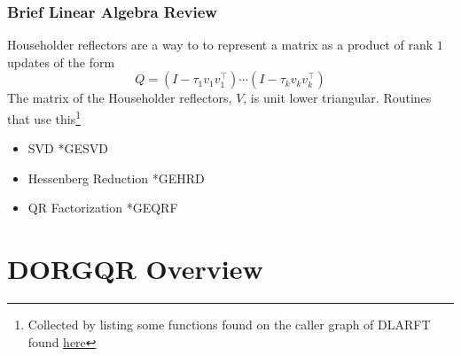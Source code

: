 \documentclass[12pt,aspectratio=169]{beamer}
\begin{document}
    \begin{frame}
        \frametitle{Brief Linear Algebra Review}
        Householder reflectors are a way to to represent a matrix as a product of rank $1$ updates of the form
        $$
            Q = \left(I - \tau_1 v_1v_1^\top\right)\cdots\left(I - \tau_k v_kv_k^\top\right) %
        $$
        The matrix of the Householder reflectors, $V$, is unit lower triangular.
        Routines that use this\footnote{Collected by listing some functions found on the caller graph of DLARFT found \textcolor{blue}{\href{https://netlib.org/lapack/explore-html//d7/d0d/group__larft_ga20e5a4f351b3ca7d30078547e55884f5_ga20e5a4f351b3ca7d30078547e55884f5_icgraph_org.svg}{here}}}
        \begin{itemize}
            \item SVD *GESVD
            \item Hessenberg Reduction *GEHRD
            \item QR Factorization *GEQRF
        \end{itemize}
    \end{frame}
    \section{DORGQR Overview}
\end{document}

